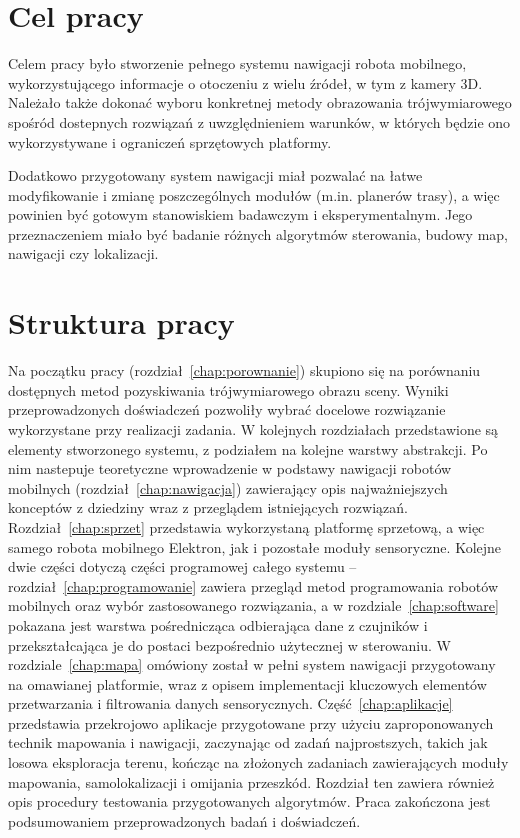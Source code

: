 \section{Cel pracy}

Celem pracy było stworzenie pełnego systemu nawigacji robota mobilnego,
wykorzystującego informacje o otoczeniu z wielu źródeł, w tym z kamery 3D.
Należało także dokonać wyboru konkretnej metody obrazowania trójwymiarowego
spośród dostepnych rozwiązań z uwzględnieniem warunków, w których będzie ono
wykorzystywane i ograniczeń sprzętowych platformy.

Dodatkowo przygotowany system nawigacji miał pozwalać na łatwe modyfikowanie
i zmianę poszczególnych modułów (m.in. planerów trasy), a więc powinien być
gotowym stanowiskiem badawczym i eksperymentalnym. Jego przeznaczeniem miało
być badanie różnych algorytmów sterowania, budowy map, nawigacji czy lokalizacji.


\section{Struktura pracy}

Na początku pracy (rozdział~\ref{chap:porownanie}) skupiono się na porównaniu
dostępnych metod pozyskiwania trójwymiarowego
obrazu sceny. Wyniki przeprowadzonych doświadczeń pozwoliły wybrać docelowe rozwiązanie
wykorzystane przy realizacji zadania. W kolejnych rozdziałach przedstawione są elementy
stworzonego systemu, z podziałem na kolejne warstwy abstrakcji. Po nim nastepuje
teoretyczne wprowadzenie w podstawy nawigacji robotów mobilnych (rozdział~\ref{chap:nawigacja})
zawierający opis najważniejszych konceptów z dziedziny wraz z przeglądem istniejących
rozwiązań. Rozdział~\ref{chap:sprzet} przedstawia wykorzystaną platformę sprzetową,
a więc samego robota mobilnego Elektron, jak i pozostałe moduły sensoryczne. Kolejne
dwie części dotyczą części programowej całego systemu -- rozdział~\ref{chap:programowanie}
zawiera przegląd metod programowania robotów mobilnych oraz wybór zastosowanego rozwiązania,
a w rozdziale~\ref{chap:software} pokazana jest warstwa pośrednicząca odbierająca
dane z czujników i przekształcająca je do postaci bezpośrednio użytecznej w sterowaniu.
W rozdziale~\ref{chap:mapa} omówiony został w pełni system nawigacji przygotowany
na omawianej platformie, wraz z opisem implementacji kluczowych elementów
przetwarzania i filtrowania danych sensorycznych.
Część~\ref{chap:aplikacje} przedstawia przekrojowo aplikacje przygotowane
przy użyciu zaproponowanych technik mapowania i nawigacji, zaczynając od zadań
najprostszych, takich jak losowa eksploracja terenu, kończąc na złożonych zadaniach
zawierających moduły mapowania, samolokalizacji i omijania przeszkód. Rozdział ten
zawiera również opis procedury testowania przygotowanych algorytmów. Praca zakończona
jest podsumowaniem przeprowadzonych badań i doświadczeń.


